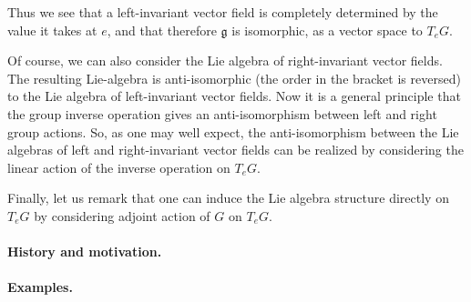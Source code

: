 \documentclass{article}
\newcommand{\fg}{\mathfrak{g}}
\begin{document}
Thus we see that a left-invariant vector field is completely
determined by the value it takes at $e$, and that therefore $\fg$ is
isomorphic, as a vector space to $T_eG$.

Of course, we can also consider the Lie algebra of right-invariant
vector fields.  The resulting Lie-algebra is anti-isomorphic (the
order in the bracket is reversed) to the Lie algebra of left-invariant
vector fields.  Now it is a general principle that the group inverse
operation gives an anti-isomorphism between left and right group
actions.  So, as one may well expect, the anti-isomorphism between the
Lie algebras of left and right-invariant vector fields can be realized
by considering the linear action of the inverse operation on $T_e G$.

Finally, let us remark that one can induce the Lie algebra structure
directly on $T_e G$ by considering adjoint action of $G$ on $T_eG$. 

\paragraph{History and motivation.}

\paragraph{Examples.}
\end{document}
